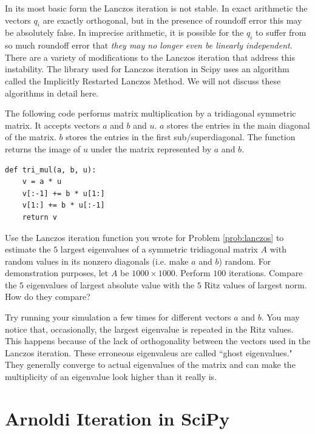 In its most basic form the Lanczos iteration is not stable.
In exact arithmetic the vectors $q_i$ are exactly orthogonal, but in the presence of roundoff error this may be absolutely false.
In imprecise arithmetic, it is possible for the $q_i$ to suffer from so much roundoff error that \textit{they may no longer even be linearly independent}.
There are a variety of modifications to the Lanczos iteration that address this instability.
The library used for Lanczos iteration in Scipy uses an algorithm called the Implicitly Restarted Lanczos Method.
We will not discuss these algorithms in detail here.


\begin{problem}
The following code performs matrix multiplication by a tridiagonal symmetric matrix.
It accepts vectors $a$ and $b$ and $u$.
$a$ stores the entries in the main diagonal of the matrix.
$b$ stores the entries in the first sub/superdiagonal.
The function returns the image of $u$ under the matrix represented by $a$ and $b$.

\begin{lstlisting}
def tri_mul(a, b, u):
    v = a * u
    v[:-1] += b * u[1:]
    v[1:] += b * u[:-1]
    return v
\end{lstlisting}

Use the Lanczos iteration function you wrote for Problem \ref{prob:lanczos} to estimate the $5$ largest eigenvalues of a symmetric tridiagonal matrix $A$ with random values in its nonzero diagonals (i.e. make $a$ and $b$) random.
For demonstration purposes, let $A$ be $1000 \times 1000$.
Perform $100$ iterations.
Compare the $5$ eigenvalues of largest absolute value with the $5$ Ritz values of largest norm.
How do they compare?

Try running your simulation a few times for different vectors $a$ and $b$.
You may notice that, occasionally, the largest eigenvalue is repeated in the Ritz values.
This happens because of the lack of orthogonality between the vectors used in the Lanczos iteration.
These erroneous eigenvaleus are called ``ghost eigenvalues."
They generally converge to actual eigenvalues of the matrix and can make the multiplicity of an eigenvalue look higher than it really is.
\end{problem}

\section*{Arnoldi Iteration in SciPy}

